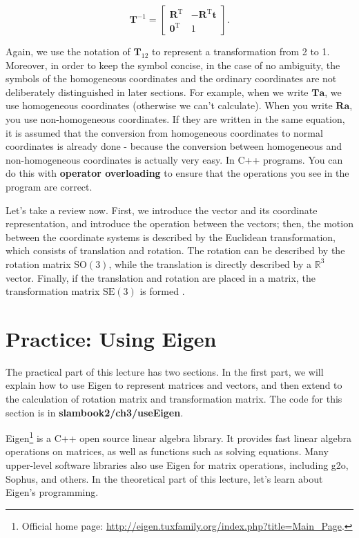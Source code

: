 \begin{equation}
{ \mathbf{T}^{ - 1}} = \left[ {\begin{array}{*{20}{c}}
    {{\mathbf{R}^\mathrm{T}}}&{ - {\mathbf{R}^\mathrm{T}}\mathbf{t}}\\
    {{\mathbf{0}^\mathrm{T}}}&1
    \end{array}} \right].
\end{equation}

Again, we use the notation of $ \mathbf{T}_{12} $ to represent a transformation from 2 to 1. Moreover, in order to keep the symbol concise, in the case of no ambiguity, the symbols of the homogeneous coordinates and the ordinary coordinates are not deliberately distinguished in later sections. For example, when we write $ \mathbf {T} \mathbf{a} $, we use homogeneous coordinates (otherwise we can't calculate). When you write $ \mathbf{Ra} $, you use non-homogeneous coordinates. If they are written in the same equation, it is assumed that the conversion from homogeneous coordinates to normal coordinates is already done - because the conversion between homogeneous and non-homogeneous coordinates is actually very easy. In C++ programs. You can do this with \textbf{operator overloading} to ensure that the operations you see in the program are correct.

Let's take a review now. First, we introduce the vector and its coordinate representation, and introduce the operation between the vectors; then, the motion between the coordinate systems is described by the Euclidean transformation, which consists of translation and rotation. The rotation can be described by the rotation matrix $ \mathrm{SO}( 3 ) $, while the translation is directly described by a $ \mathbb{R}^ 3 $ vector. Finally, if the translation and rotation are placed in a matrix, the transformation matrix $ \mathrm{SE}( 3 ) $ is formed .

\section{Practice: Using Eigen}
The practical part of this lecture has two sections. In the first part, we will explain how to use Eigen to represent matrices and vectors, and then extend to the calculation of rotation matrix and transformation matrix. The code for this section is in \textbf{slambook2/ch3/useEigen}.

Eigen\footnote{Official home page: \url{http://eigen.tuxfamily.org/index.php?title=Main_Page}. } is a C++ open source linear algebra library. It provides fast linear algebra operations on matrices, as well as functions such as solving equations. Many upper-level software libraries also use Eigen for matrix operations, including g2o, Sophus, and others. In the theoretical part of this lecture, let's learn about Eigen's programming.

